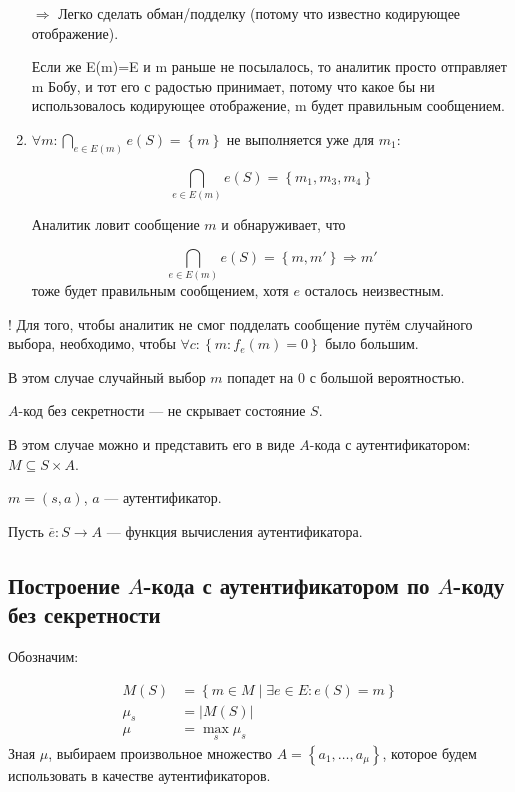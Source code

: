 \begin{enumerate}
    $\Rightarrow$ Легко сделать обман/подделку (потому что
    известно кодирующее отображение).

    Если же {\textbar}E(m){\textbar}={\textbar}E{\textbar} и m раньше
    не посылалось, то аналитик просто отправляет m Бобу, и тот его с
    радостью принимает, потому что какое бы ни использовалось кодирующее
    отображение, m будет правильным сообщением.

  \item
    $\forall m: \bigcap\limits_{e \in E\left( m \right)} e\left( S \right) = \left\{ m \right\}$
    не выполняется уже для $m_1$:

    \begin{equation*}
      \bigcap\limits_{e \in E\left( m \right)} e\left( S \right)
        = \left\{{m}_{1},{m}_{3},{m}_{4}\right\}
    \end{equation*}

    Аналитик ловит сообщение $m$ и обнаруживает, что

    \begin{equation*}
      \bigcap\limits_{e \in E\left( m \right)} e\left( S \right)
      = \left\{m,m'\right\} \Rightarrow m'
    \end{equation*}
    тоже будет правильным сообщением, хотя $e$ осталось неизвестным.
\end{enumerate}

! Для того, чтобы аналитик не смог подделать сообщение путём случайного
выбора, необходимо, чтобы 
${\forall}c:\left\{m:{f}_{e}\left(m\right)=0\right\}$ было большим.

В этом случае случайный выбор $m$ попадет на $0$ с большой вероятностью.

$A$-код без секретности --- не скрывает состояние $S$. 

В этом случае можно и представить его в виде $A$-кода с аутентификатором: 
 $M{\subseteq}S\times A$.

$m=(s, a)$, $a$ --- аутентификатор.

Пусть  $\overline{e}: S \rightarrow A$ --- функция вычисления аутентификатора.

\subsection{Построение $A$-кода с аутентификатором по $A$-коду без секретности}

Обозначим:

\begin{equation*}
  \begin{split}
    M\left(S\right)
      &=\left\{ m\in M\mid\exists e \in E:e\left(S\right)=m\right\} \\
    \mu_{s}
      &=\left|M\left(S\right)\right| \\
    \mu
      &=\max\limits_{s}{\mu}_{s}
  \end{split}
\end{equation*}
Зная $\mu$, выбираем произвольное множество 
$A = \left\{{a}_{1},{\dots},{a}_{\mu }\right\}$, которое будем
использовать в качестве аутентификаторов.

